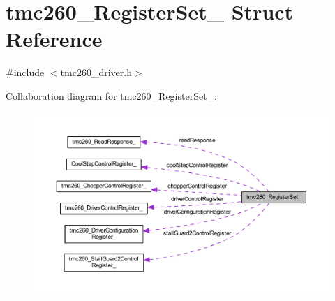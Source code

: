 \hypertarget{structtmc260___register_set__}{}\section{tmc260\+\_\+\+Register\+Set\+\_\+ Struct Reference}
\label{structtmc260___register_set__}


{\ttfamily \#include $<$tmc260\+\_\+driver.\+h$>$}



Collaboration diagram for tmc260\+\_\+\+Register\+Set\+\_\+\+:\nopagebreak
\begin{figure}[H]
\begin{center}
\leavevmode
\includegraphics[width=350pt]{structtmc260___register_set____coll__graph}
\end{center}
\end{figure}
